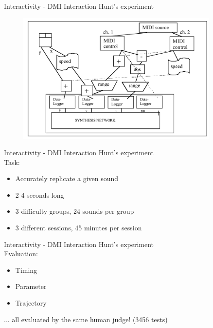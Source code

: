 \documentclass{beamer}
\begin{document}
\begin{frame}{Interactivity - DMI Interaction} 
    Hunt's experiment\\
    \vspace{5mm}
    \begin{figure}[h]
        \includegraphics[width=0.9\textwidth]{hunt2000_mapping_c2.png}
    \end{figure}
\end{frame}


\begin{frame}{Interactivity - DMI Interaction} 
    Hunt's experiment\\
    \vspace{5mm}
    Task:
    \begin{itemize}
        \item Accurately replicate a given sound
        \item 2-4 seconds long
        \item 3 difficulty groups, 24 sounds per group
        \item 3 different sessions, 45 minutes per session
    \end{itemize}
\end{frame}

\begin{frame}{Interactivity - DMI Interaction} 
    Hunt's experiment\\
    \vspace{5mm}
    Evaluation:
    \begin{itemize}
        \item Timing
        \item Parameter
        \item Trajectory
    \end{itemize}
    ... all evaluated by the same human judge! (3456 tests)
\end{frame}
\end{document}
